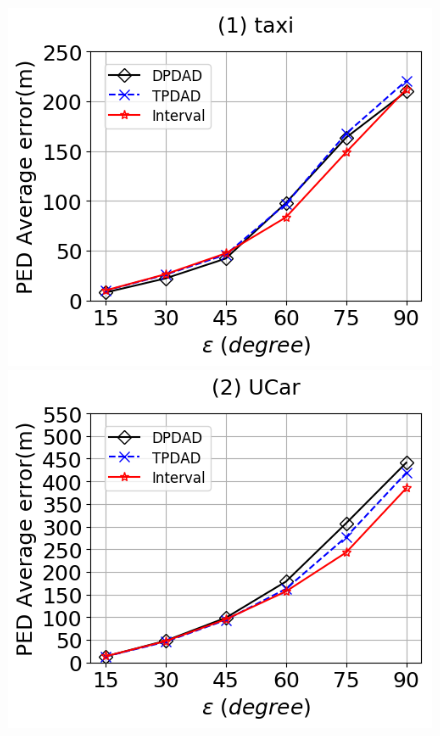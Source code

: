 \begin{figure}[tb!]
	\centering
	\includegraphics[scale=0.315]{Figures/Exp-DAD-pedAveErr-epsilon-taxi.png} \hspace{1ex}
	\includegraphics[scale=0.315]{Figures/Exp-DAD-pedAveErr-epsilon-service.png}	\hspace{1ex}

\end{figure}
